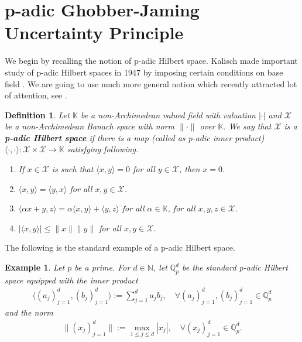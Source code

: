 \documentclass{amsart}
\newtheorem{definition}[theorem]{Definition}
\newtheorem{example}[theorem]{Example}
\begin{document}
\section{p-adic Ghobber-Jaming Uncertainty Principle}

We begin by recalling the notion of p-adic Hilbert space.  Kalisch made important study of p-adic Hilbert spaces in 1947 by imposing certain conditions on base field \cite{KALISCH}. We are going to use much more general notion which recently attracted lot of attention, see \cite{KRISHNA3, KRISHNA4, ANIELLOMANCINIPARISI, ANIELLOMANCINIPARISI2}.
\begin{definition}\cite{KRISHNA3, KRISHNA4, ANIELLOMANCINIPARISI, ANIELLOMANCINIPARISI2} \label{PADICDEF}
	Let $\mathbb{K}$ be a non-Archimedean  valued field with valuation $|\cdot|$ and $\mathcal{X}$ be a non-Archimedean Banach space with norm $\|\cdot\|$ over $\mathbb{K}$. We say that $\mathcal{X}$ is a \textbf{p-adic Hilbert space} if there is a map (called as p-adic inner product) $\langle \cdot, \cdot \rangle: \mathcal{X} \times \mathcal{X} \to \mathbb{K}$ satisfying following.
	\begin{enumerate}[\upshape (i)]
		\item If $x \in \mathcal{X}$ is such that $\langle x,y \rangle =0$ for all $y \in \mathcal{X}$, then $x=0$.
		\item $\langle x, y \rangle =\langle y, x \rangle$ for all $x,y \in \mathcal{X}$.
		\item $\langle \alpha x+y,z \rangle =\alpha \langle x,  y \rangle+\langle y,z\rangle$ for all  $\alpha  \in \mathbb{K}$, for all $x,y,z \in \mathcal{X}$.
		\item $|\langle x, y \rangle |\leq \|x\|\|y\|$ for all $x,y \in \mathcal{X}$.
	\end{enumerate}
\end{definition}
The following is the  standard example of a p-adic Hilbert space.
\begin{example}\cite{KALISCH} \label{E}
	Let $p$ be a prime. For $d \in \mathbb{N}$, let $\mathbb{Q}_p^d$ be the standard p-adic Hilbert space equipped with the inner product 
	\begin{align*}
		\langle (a_j)_{j=1}^d,(b_j)_{j=1}^d\rangle := \sum_{j=1}^da_jb_j,  \quad \forall (a_j)_{j=1}^d,(b_j)_{j=1}^d \in \mathbb{Q}_p^d
	\end{align*}
	and the norm 
	\begin{align*}
		\|(x_j)_{j=1}^d\|:= \max_{1\leq j \leq d}|x_j|, \quad \forall (x_j)_{j=1}^d\in 	\mathbb{Q}_p^d.
	\end{align*}
\end{example}
\end{document}
